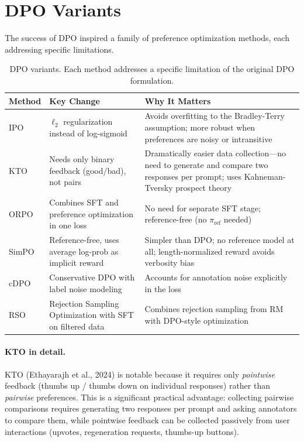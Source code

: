 \section{DPO Variants}
\label{sec:dpo_variants}

The success of DPO inspired a family of preference optimization methods,
each addressing specific limitations.

\begin{table}[H]
\centering
\small
\begin{tabularx}{\textwidth}{@{}l l X@{}}
\toprule
\textbf{Method} & \textbf{Key Change} & \textbf{Why It Matters} \\
\midrule
IPO & $\ell_2$ regularization instead of log-sigmoid &
  Avoids overfitting to the Bradley-Terry assumption; more robust
  when preferences are noisy or intransitive \\
KTO & Needs only binary feedback (good/bad), not pairs &
  Dramatically easier data collection---no need to generate and compare
  two responses per prompt; uses Kahneman-Tversky prospect theory \\
ORPO & Combines SFT and preference optimization in one loss &
  No need for separate SFT stage; reference-free (no $\pi_{\text{ref}}$
  needed) \\
SimPO & Reference-free, uses average log-prob as implicit reward &
  Simpler than DPO; no reference model at all; length-normalized
  reward avoids verbosity bias \\
cDPO & Conservative DPO with label noise modeling &
  Accounts for annotation noise explicitly in the loss \\
RSO & Rejection Sampling Optimization with SFT on filtered data &
  Combines rejection sampling from RM with DPO-style optimization \\
\bottomrule
\end{tabularx}
\caption{DPO variants.  Each method addresses a specific limitation of
the original DPO formulation.}
\label{tab:dpo_variants}
\end{table}

\paragraph{KTO in detail.}
KTO (Ethayarajh et al., 2024) is notable because it requires only
\emph{pointwise} feedback (thumbs up / thumbs down on individual responses)
rather than \emph{pairwise} preferences.  This is a significant practical
advantage: collecting pairwise comparisons requires generating two responses
per prompt and asking annotators to compare them, while pointwise feedback
can be collected passively from user interactions (upvotes, regeneration
requests, thumbs-up buttons).

